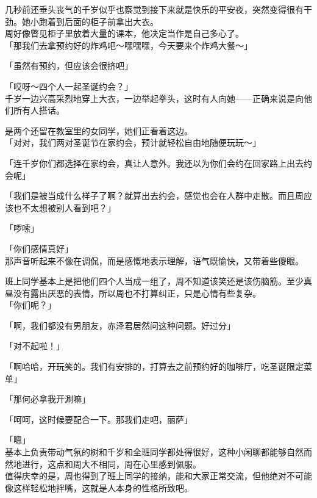 几秒前还垂头丧气的千岁似乎也察觉到接下来就是快乐的平安夜，突然变得很有干劲。她小跑着到后面的柜子前拿出大衣。\\

周好像瞥见柜子里放着大量的课本，他决定当作是自己多心了。\\

「那我们去拿预约好的炸鸡吧～嘿嘿嘿，今天要来个炸鸡大餐～」

「虽然有预约，但应该会很挤吧」

「哎呀～四个人一起圣诞约会？」\\

千岁一边兴高采烈地穿上大衣，一边举起拳头，这时有人向她——正确来说是向他们所有人搭话。

是两个还留在教室里的女同学，她们正看着这边。\\

「对对，我们两对圣诞节在家约会，预计就轻松自由地随便玩玩～」

「连千岁你们都选择在家约会，真让人意外。我还以为你们会约在回家路上出去约会呢」

「我们是被当成什么样子了啊？就算出去约会，感觉也会在人群中走散。而且周应该也不太想被别人看到吧？」

「啰嗦」

「你们感情真好」\\

那声音听起来不像在调侃，而是感慨地表示理解，语气既愉快，又带着些傻眼。

班上同学基本上是把他们四个人当成一组了，周不知道该笑还是该伤脑筋。至少真昼没有露出厌恶的表情，所以周也不打算纠正，只是心情有些复杂。\\

「你们呢？」

「啊，我们都没有男朋友，赤泽君居然问这种问题。好过分」

「对不起啦！」

「啊哈哈，开玩笑的。我们有安排的，打算去之前预约好的咖啡厅，吃圣诞限定菜单」

「那何必拿我开涮嘛」

「呵呵，这时候要配合一下。那我们走吧，丽萨」

「嗯」\\

基本上负责带动气氛的树和千岁和全班同学都处得很好，这种小闲聊都能够自然而然地进行，这点和周大不相同，周在心里感到佩服。\\

值得庆幸的是，周也得到了班上同学的接纳，能和大家正常交流，但他绝对不可能像这样轻松地拌嘴，这就是人本身的性格所致吧。

